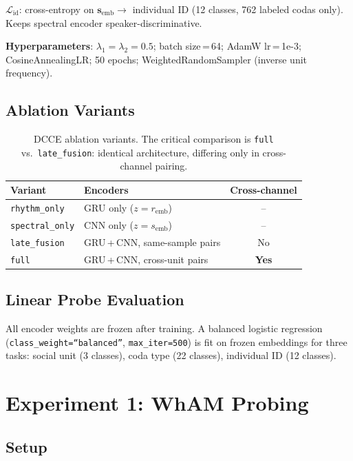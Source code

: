 \documentclass[9pt,a4paper,twocolumn,twoside]{rho-class/rho}
\begin{document}
\textbf{$\mathcal{L}_\text{id}$}: cross-entropy on $\mathbf{s}_\text{emb} \to$ individual ID (12 classes, 762 labeled codas only). Keeps spectral encoder speaker-discriminative.

\textbf{Hyperparameters}: $\lambda_1 = \lambda_2 = 0.5$; batch size\,=\,64; AdamW lr\,=\,1e-3; CosineAnnealingLR; 50 epochs; WeightedRandomSampler (inverse unit frequency).

\subsection{Ablation Variants}

\begin{table}[H]
\centering
\caption{DCCE ablation variants. The critical comparison is \texttt{full} vs.\ \texttt{late\_fusion}: identical architecture, differing only in cross-channel pairing.}
\label{tab:ablations}
\small
\begin{tabular}{llc}
\toprule
\textbf{Variant} & \textbf{Encoders} & \textbf{Cross-channel}\\
\midrule
\texttt{rhythm\_only}   & GRU only ($z = r_\text{emb}$)     & --  \\
\texttt{spectral\_only} & CNN only ($z = s_\text{emb}$)     & --  \\
\texttt{late\_fusion}   & GRU\,+\,CNN, same-sample pairs & No  \\
\texttt{full}           & GRU\,+\,CNN, cross-unit pairs  & \textbf{Yes}\\
\bottomrule
\end{tabular}
\end{table}

\subsection{Linear Probe Evaluation}

All encoder weights are frozen after training. A balanced logistic regression (\texttt{class\_weight=``balanced''}, \texttt{max\_iter=500}) is fit on frozen embeddings for three tasks: social unit (3 classes), coda type (22 classes), individual ID (12 classes).

\section{Experiment 1: WhAM Probing}
\label{sec:wham}

\subsection{Setup}
\end{document}
